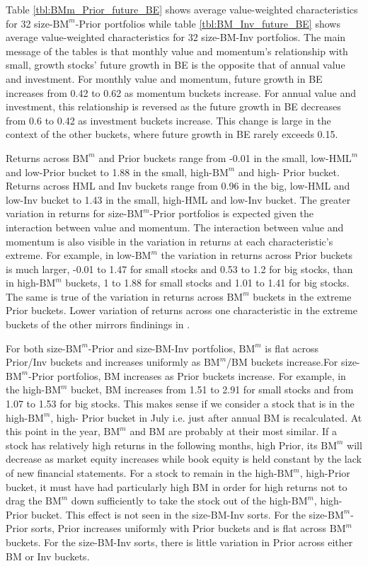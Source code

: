 
Table \ref{tbl:BMm_Prior_future_BE} shows average value-weighted characteristics for 32
size-$\text{BM}^m$-Prior portfolios while table \ref{tbl:BM_Inv_future_BE} shows average
value-weighted characteristics for 32 size-BM-Inv portfolios. The main message of the
tables is that monthly value and momentum's relationship with small, growth stocks' future
growth in BE is the opposite that of annual value and investment. For monthly value and
momentum, future growth in BE increases from 0.42 to 0.62 as momentum buckets increase.
For annual value and investment, this relationship is reversed as the future growth in BE
decreases from 0.6 to 0.42 as investment buckets increase. This change is large in the
context of the other buckets, where future growth in BE rarely exceeds 0.15.

Returns across $\text{BM}^m$ and Prior buckets range from -0.01 in the small,
low-$\text{HML}^m$ and low-Prior bucket to 1.88 in the small, high-$\text{BM}^m$ and high-
Prior bucket. Returns across HML and Inv buckets range from 0.96 in the big, low-HML and
low-Inv bucket to 1.43 in the small, high-HML and low-Inv bucket. The greater variation in
returns for size-$\text{BM}^m$-Prior portfolios is expected given the interaction between
value and momentum. The interaction between value and momentum is also visible in the
variation in returns at each characteristic's extreme. For example, in low-$\text{BM}^m$
the variation in returns across Prior buckets is much larger, -0.01 to 1.47 for small
stocks and 0.53 to 1.2 for big stocks, than in high-$\text{BM}^m$ buckets, 1 to 1.88 for
small stocks and 1.01 to 1.41 for big stocks. The same is true of the variation in returns
across $\text{BM}^m$ buckets in the extreme Prior buckets. Lower variation of returns
across one characteristic in the extreme buckets of the other mirrors findinings in
\textcite{asness2013devil}.

For both size-$\text{BM}^m$-Prior and size-BM-Inv portfolios, $\text{BM}^m$ is flat across
Prior/Inv buckets and increases uniformly as $\text{BM}^m$/BM buckets increase.For
size-$\text{BM}^m$-Prior portfolios, BM increases as Prior buckets increase. For example,
in the high-$\text{BM}^m$ bucket, BM increases from 1.51 to 2.91 for small stocks and from
1.07 to 1.53 for big stocks. This makes sense if we consider a stock that is in the
high-$\text{BM}^m$, high- Prior bucket in July i.e. just after annual BM is recalculated.
At this point in the year, $\text{BM}^m$ and BM are probably at their most similar. If a
stock has relatively high returns in the following months, high Prior, its $\text{BM}^m$
will decrease as market equity increases while book equity is held constant by the lack of
new financial statements. For a stock to remain in the high-$\text{BM}^m$, high-Prior
bucket, it must have had particularly high BM in order for high returns not to drag the
$\text{BM}^m$ down sufficiently to take the stock out of the high-$\text{BM}^m$, high-
Prior bucket. This effect is not seen in the size-BM-Inv sorts. For the
size-$\text{BM}^m$-Prior sorts, Prior increases uniformly with Prior buckets and is flat
across $\text{BM}^m$ buckets. For the size-BM-Inv sorts, there is little variation in
Prior across either BM or Inv buckets.

